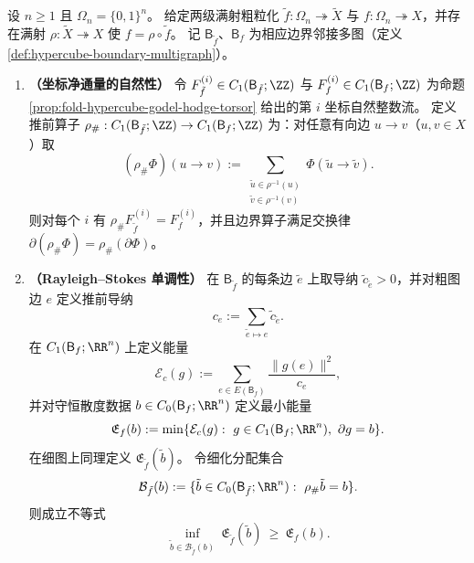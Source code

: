 
\begin{proposition}\label{prop:fold-coarsegraining-naturality-rayleigh-stokes}
设 \(n\ge 1\) 且 \(\Omega_n=\{0,1\}^n\)。
给定两级满射粗粒化 \(\tilde f:\Omega_n\twoheadrightarrow \tilde X\) 与 \(f:\Omega_n\twoheadrightarrow X\)，并存在满射 \(\rho:\tilde X\twoheadrightarrow X\) 使 \(f=\rho\circ \tilde f\)。
记 \(\mathsf B_{\tilde f}\)、\(\mathsf B_f\) 为相应边界邻接多图（定义 \ref{def:hypercube-boundary-multigraph}）。
\begin{enumerate}
  \item \textbf{（坐标净通量的自然性）}
  令 \(F^{(i)}_{\tilde f}\in C_1(\mathsf B_{\tilde f};\ZZ)\) 与 \(F^{(i)}_{f}\in C_1(\mathsf B_{f};\ZZ)\) 为命题 \ref{prop:fold-hypercube-godel-hodge-torsor} 给出的第 \(i\) 坐标自然整数流。
  定义推前算子 \(\rho_\#:C_1(\mathsf B_{\tilde f};\ZZ)\to C_1(\mathsf B_f;\ZZ)\) 为：对任意有向边 \(u\to v\)（\(u,v\in X\)）取
  \[
  (\rho_\#\Phi)(u\to v):=\sum_{\substack{\tilde u\in\rho^{-1}(u)\\ \tilde v\in\rho^{-1}(v)}}\Phi(\tilde u\to \tilde v).
  \]
  则对每个 \(i\) 有 \(\rho_\#F^{(i)}_{\tilde f}=F^{(i)}_{f}\)，并且边界算子满足交换律 \(\partial(\rho_\#\Phi)=\rho_\#(\partial\Phi)\)。
  \item \textbf{（Rayleigh--Stokes 单调性）}
  在 \(\mathsf B_{\tilde f}\) 的每条边 \(\tilde e\) 上取导纳 \(\tilde c_{\tilde e}>0\)，并对粗图边 \(e\) 定义推前导纳
  \[
  c_e:=\sum_{\tilde e\mapsto e}\tilde c_{\tilde e}.
  \]
  在 \(C_1(\mathsf B_f;\RR^n)\) 上定义能量
  \[
  \mathcal E_c(g):=\sum_{e\in E(\mathsf B_f)}\frac{\|g(e)\|^2}{c_e},
  \]
  并对守恒散度数据 \(b\in C_0(\mathsf B_f;\RR^n)\) 定义最小能量
  \[
  \mathfrak E_f(b):=\min\{\mathcal E_c(g):\ g\in C_1(\mathsf B_f;\RR^n),\ \partial g=b\}.
  \]
  在细图上同理定义 \(\mathfrak E_{\tilde f}(\tilde b)\)。
  令细化分配集合
  \[
  \mathcal B_{\tilde f}(b):=\{\tilde b\in C_0(\mathsf B_{\tilde f};\RR^n):\ \rho_\#\tilde b=b\}.
  \]
  则成立不等式
  \[
  \inf_{\tilde b\in\mathcal B_{\tilde f}(b)}\ \mathfrak E_{\tilde f}(\tilde b)\ \ge\ \mathfrak E_f(b).
  \]
\end{enumerate}
\end{proposition}
